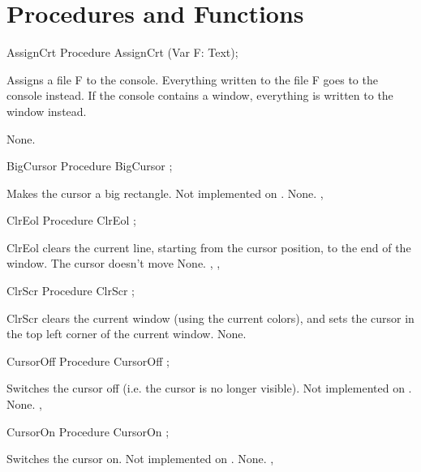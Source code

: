 \section{Procedures and Functions}
\begin{procedure}{AssignCrt}
\Declaration
Procedure AssignCrt (Var F: Text);

\Description

Assigns a file F to the console. Everything written to the file F goes to
the console instead. If the console contains a window, everything is written
to the window instead.

\Errors
None.
\SeeAlso
{}
\end{procedure}
\latex{}
 \html{}
\begin{procedure}{BigCursor}
\Declaration
Procedure BigCursor ;

\Description
Makes the cursor a big rectangle. 
Not implemented on \linux.
\Errors
None.
\SeeAlso
{}, 
\end{procedure}
\begin{procedure}{ClrEol}
\Declaration
Procedure ClrEol ;

\Description
 ClrEol clears the current line, starting from the cursor position, to the
end of the window. The cursor doesn't move
\Errors
None.
\SeeAlso
{}, , 
\end{procedure}
\latex{}
 \html{}
\begin{procedure}{ClrScr}
\Declaration
Procedure ClrScr ;

\Description
 ClrScr clears the current window (using the current colors), 
and sets the cursor in the top left
corner of the current window.
\Errors
None.
\SeeAlso
\end{procedure}
\latex{}
 \html{}
\begin{procedure}{CursorOff}
\Declaration
Procedure CursorOff ;

\Description
Switches the cursor off (i.e. the cursor is no
longer visible). 
Not implemented on \linux.
\Errors
None.
\SeeAlso
{}, 
\end{procedure}
\begin{procedure}{CursorOn}
\Declaration
Procedure CursorOn ;

\Description
Switches the cursor on. 
Not implemented on \linux.
\Errors
None.
\SeeAlso
{}, 
\end{procedure}
